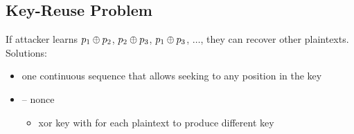 \documentclass[draft]{article}
\begin{document}
\subsection{Key-Reuse Problem}
If attacker learns $p_1 \oplus p_2$, $p_2 \oplus p_3$, $p_1 \oplus p_3$, $\dots$, they can recover other plaintexts.
Solutions:
\begin{itemize}[nosep]
    \item one continuous sequence that allows seeking to any position in the key
    \item {} -- \glsdesc{nonce}
          \begin{itemize}[nosep]\item xor key with  for each plaintext to produce different key\end{itemize}
\end{itemize}
\end{document}
